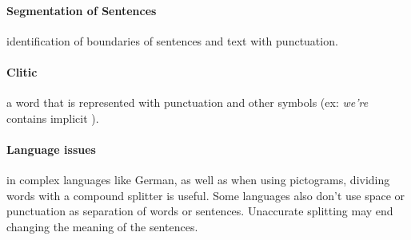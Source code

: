 \paragraph{Segmentation of Sentences} identification of boundaries of sentences and text with punctuation.

\paragraph{Clitic} a word that is represented with punctuation and other symbols (ex: \textit{we're} contains implicit ).

\paragraph{Language issues} in complex languages like German, as well as when using pictograms, dividing words with a compound splitter is useful.
Some languages also don't use space or punctuation as separation of words or sentences. Unaccurate splitting may end changing the meaning of the sentences.


